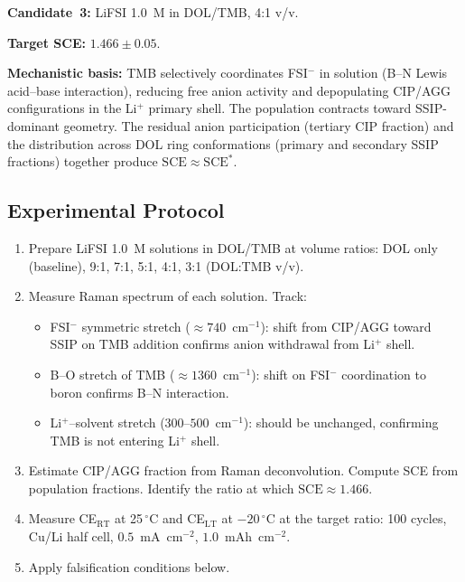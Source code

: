 \documentclass[11pt]{article}
\theoremstyle{plain}
\theoremstyle{definition}
\theoremstyle{remark}
\begin{document}
\textbf{Candidate~3:} LiFSI 1.0~M in DOL/TMB, 4:1 v/v.

\textbf{Target SCE:} $1.466 \pm 0.05$.

\textbf{Mechanistic basis:} TMB selectively coordinates FSI$^-$ in
solution (B--N Lewis acid--base interaction), reducing free anion
activity and depopulating CIP/AGG configurations in the Li$^+$ primary
shell.  The population contracts toward SSIP-dominant geometry.
The residual anion participation (tertiary CIP fraction) and the
distribution across DOL ring conformations (primary and secondary
SSIP fractions) together produce $\mathrm{SCE} \approx \mathrm{SCE}^{*}$.

\subsection{Experimental Protocol}

\begin{enumerate}[leftmargin=2em]
  \item Prepare LiFSI 1.0~M solutions in DOL/TMB at volume ratios:
        DOL only (baseline), 9:1, 7:1, 5:1, 4:1, 3:1 (DOL:TMB v/v).
  \item Measure Raman spectrum of each solution. Track:
    \begin{itemize}
      \item FSI$^-$ symmetric stretch ($\approx 740$~cm$^{-1}$):
            shift from CIP/AGG toward SSIP on TMB addition confirms
            anion withdrawal from Li$^+$ shell.
      \item B--O stretch of TMB ($\approx 1360$~cm$^{-1}$): shift
            on FSI$^-$ coordination to boron confirms B--N interaction.
      \item Li$^+$--solvent stretch ($300$--$500$~cm$^{-1}$): should
            be unchanged, confirming TMB is not entering Li$^+$ shell.
    \end{itemize}
  \item Estimate CIP/AGG fraction from Raman deconvolution.
        Compute SCE from population fractions.
        Identify the ratio at which $\mathrm{SCE} \approx 1.466$.
  \item Measure CE$_{\mathrm{RT}}$ at 25\,$^\circ$C and
        CE$_{\mathrm{LT}}$ at $-20\,^\circ$C at the target ratio:
        100 cycles, Cu/Li half cell,
        $0.5$~mA~cm$^{-2}$, $1.0$~mAh~cm$^{-2}$.
  \item Apply falsification conditions below.
\end{enumerate}
\end{document}
